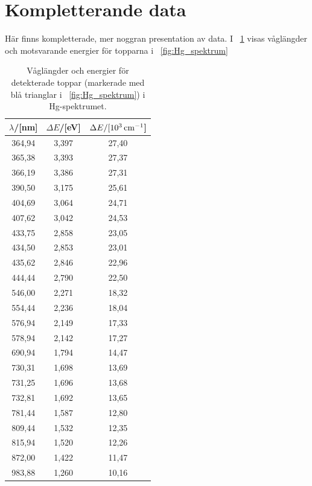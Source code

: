 \documentclass[11pt,a4paper]{article}
\newcommand{\figref}{\figurename~\ref}
\newcommand{\tabref}{\tablename~\ref} %
\begin{document}
\section{Kompletterande data}\label{sec:kompl}
Här finns kompletterade, mer noggran presentation av data. I \tabref{tab:Hg_toppar} visas våglängder och motsvarande energier för topparna i \figref{fig:Hg_spektrum}

\begin{table}
\centering
\caption{Våglängder och energier för detekterade toppar (markerade med
  blå trianglar i \figref{fig:Hg_spektrum}) i Hg-spektrumet. } 
\label{tab:Hg_toppar}
\begin{tabular}{|c|c|c|}\hline
$\lambda$/[nm] & $\Delta E$/[eV]  &$\Delta E/[\unit[10^3]{cm^{-1}}$]
\\ \hline
364,94  	& 3,397 	& 27,40 \\ 
365,38  	& 3,393 	& 27,37 \\ 
366,19  	& 3,386 	& 27,31 \\ 
390,50  	& 3,175 	& 25,61 \\ 
404,69  	& 3,064 	& 24,71 \\ 
407,62  	& 3,042 	& 24,53 \\ 
433,75  	& 2,858 	& 23,05 \\ 
434,50  	& 2,853 	& 23,01 \\ 
435,62  	& 2,846 	& 22,96 \\ 
444,44  	& 2,790 	& 22,50 \\ 
546,00  	& 2,271 	& 18,32 \\ 
554,44  	& 2,236 	& 18,04 \\ 
576,94  	& 2,149 	& 17,33 \\ 
578,94  	& 2,142 	& 17,27 \\ 
690,94  	& 1,794 	& 14,47 \\ 
730,31  	& 1,698 	& 13,69 \\ 
731,25  	& 1,696 	& 13,68 \\ 
732,81  	& 1,692 	& 13,65 \\ 
781,44  	& 1,587 	& 12,80 \\ 
809,44  	& 1,532 	& 12,35 \\ 
815,94  	& 1,520 	& 12,26 \\ 
872,00  	& 1,422 	& 11,47 \\ 
983,88  	& 1,260 	& 10,16 \\ 
\hline
\end{tabular}
\end{table}
\end{document}
